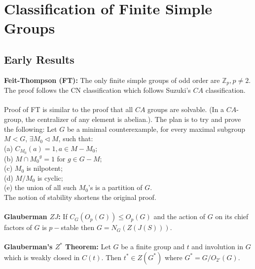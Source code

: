 \chapter{Classification of Finite Simple Groups}
\section{Early Results}
{\bf Feit-Thompson (FT):}  The only finite simple groups of odd order are
${\mathbb Z}_p, p\ne 2$. The proof follows the CN classification which follows
Suzuki's $CA$ classification.\\
\\
Proof of FT is similar to the proof that all $CA$ groups are solvable. (In a $CA$-group,
the centralizer of any element is abelian.).  The plan is to try and prove the following:
Let $G$ be a minimal counterexample, for every maximal subgroup $M<G$, $\exists M_0 \lhd M$,
such that:\\
(a) $C_{M_0}(a) =1, a \in M - M_0$;\\
(b) $M \cap {M_0}^g = 1$ for $g \in G-M$;\\
(c) $M_0$ is nilpotent;\\
(d) $M/M_0$ is cyclic; \\
(e) the union of all such $M_0$'s is a partition of $G$.\\
The notion of stability shortens the original proof.
\\
\\
{\bf Glauberman $ZJ$:}  If $C_G(O_p(G)) \le O_p(G)$ and the action of
$G$ on its chief factors of $G$ is $p-$stable then $G=N_G(Z(J(S)))$. \\
\\
{\bf Glauberman's $Z^*$ Theorem:}
Let $G$ be a finite group and $t$ and involution in $G$ which is weakly closed in
$C(t)$.  Then $t^* \in Z(G^*)$  where $G^*= G/O_{2'}(G)$.
